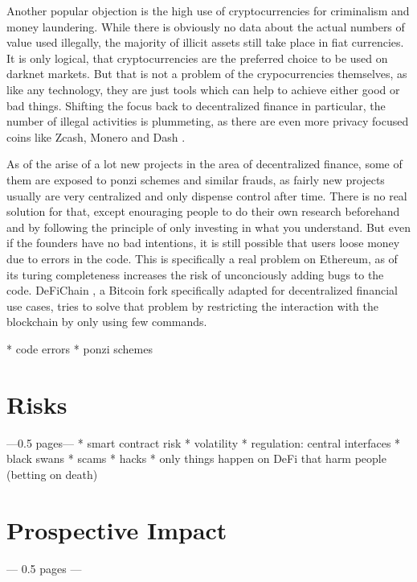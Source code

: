 Another popular objection is the high use of cryptocurrencies for criminalism and money laundering. While there is obviously no data about the
actual numbers of value used illegally, the majority of illicit assets still take place in fiat currencies. It is only logical, that
cryptocurrencies are the preferred choice to be used on darknet markets. But that is not a problem of the crypocurrencies themselves, as like any
technology, they are just tools which can help to achieve either good or bad things. Shifting the focus back to decentralized finance in particular,
the number of illegal activities is plummeting, as there are even more privacy focused coins like Zcash, Monero and Dash \cite[p.\ 13]{FDD2018}.

As of the arise of a lot new projects in the area of decentralized finance, some of them are exposed to ponzi schemes and similar frauds, as
fairly new projects usually are very centralized and only dispense control after time. There is no real solution for that, except enouraging
people to do their own research beforehand and by following the principle of only investing in what you understand. But even if the founders
have no bad intentions, it is still possible that users loose money due to errors in the code. This is specifically a real problem on
Ethereum, as of its turing completeness increases the risk of unconciously adding bugs to the code. DeFiChain \cite{DeFiChain}, 
a Bitcoin fork specifically adapted for decentralized financial use cases, tries to solve that problem by restricting the interaction with the
blockchain by only using few commands.

* code errors
* ponzi schemes

\section{Risks}
---0.5 pages---
* smart contract risk
* volatility
* regulation: central interfaces
* black swans
* scams
* hacks
* only things happen on DeFi that harm people (betting on death)

\section{Prospective Impact}
--- 0.5 pages ---